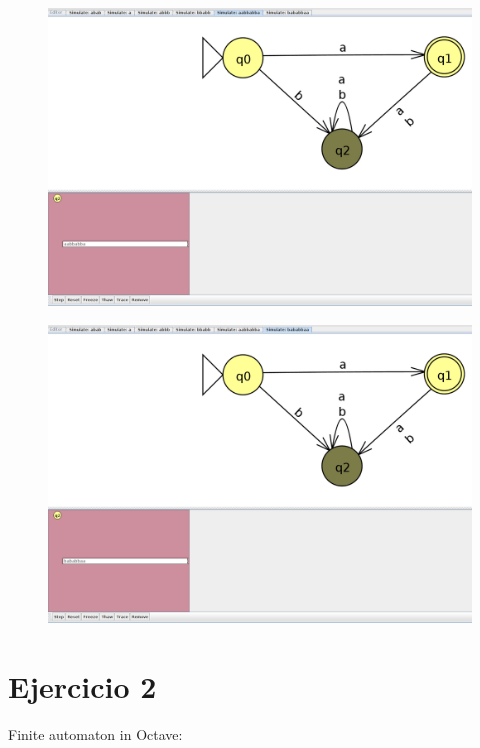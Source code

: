 \documentclass[11pt]{article}
\begin{document}
\begin{figure}[]
\centering
\includegraphics[scale=0.2]{images/Cadena5.png}
\label{}
\\
\end{figure}

\begin{figure}[]
\centering
\includegraphics[scale=0.2]{images/Cadena6.png}
\label{}
\\
\end{figure}

\section*{Ejercicio 2}
Finite automaton in Octave:
\end{document}
